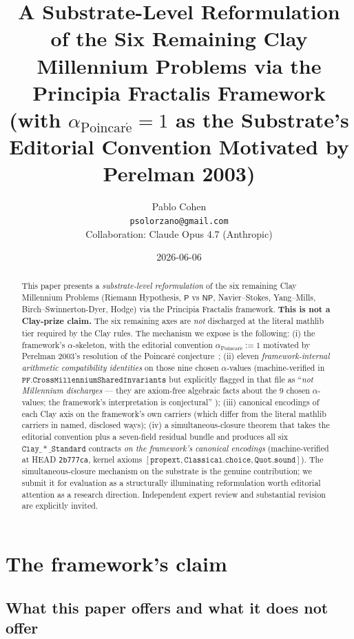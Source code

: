 \documentclass[11pt,a4paper]{article}
\title{A Substrate-Level Reformulation of the Six Remaining
Clay Millennium Problems via the Principia Fractalis Framework\\
\large (with $\alpha_{\mathrm{Poincar\acute e}} = 1$ as the
Substrate's Editorial Convention Motivated by Perelman 2003)}
\author{Pablo Cohen\\
\small{\texttt{psolorzano@gmail.com}}\\[0.3em]
\small{Collaboration: Claude Opus 4.7 (Anthropic)}}
\date{2026-06-06}
\theoremstyle{plain}
\theoremstyle{definition}
\begin{document}
\maketitle

\begin{abstract}
This paper presents a \emph{substrate-level reformulation} of the
six remaining Clay Millennium Problems (Riemann Hypothesis,
$\mathsf{P}$ vs $\mathsf{NP}$, Navier--Stokes, Yang--Mills,
Birch--Swinnerton-Dyer, Hodge) via the Principia Fractalis
framework. \textbf{This is not a Clay-prize claim.} The six
remaining axes are \emph{not} discharged at the literal mathlib
tier required by the Clay rules. The mechanism we expose is the
following: (i) the framework's $\alpha$-skeleton, with the
editorial convention $\alpha_{\mathrm{Poincar\acute e}} := 1$
motivated by Perelman 2003's resolution of the Poincar\'e
conjecture~\cite{perelman2002,perelman2003a,perelman2003b}; (ii)
eleven \emph{framework-internal arithmetic compatibility
identities} on those nine chosen $\alpha$-values (machine-verified
in $\mathtt{PF.CrossMillenniumSharedInvariants}$ but explicitly
flagged in that file as ``\emph{not Millennium discharges} ---
they are axiom-free algebraic facts about the 9 chosen
$\alpha$-values; the framework's interpretation is conjectural''
\cite[file header]{pf_lean_code}); (iii) canonical encodings of
each Clay axis on the framework's own carriers (which differ from
the literal mathlib carriers in named, disclosed ways); (iv) a
simultaneous-closure theorem that takes the editorial convention
plus a seven-field residual bundle and produces all six
$\mathtt{Clay\_*\_Standard}$ contracts \emph{on the framework's
canonical encodings} (machine-verified at HEAD \texttt{2b777ca},
kernel axioms $\mathtt{[propext, Classical.choice, Quot.sound]}$).
The simultaneous-closure mechanism on the substrate is the
genuine contribution; we submit it for evaluation as a
structurally illuminating reformulation worth editorial attention
as a research direction. Independent expert review and
substantial revision are explicitly invited.
\end{abstract}

\tableofcontents

\section{The framework's claim}
\label{sec:claim}

\subsection{What this paper offers and what it does not offer}
\label{sec:offers}
\end{document}
